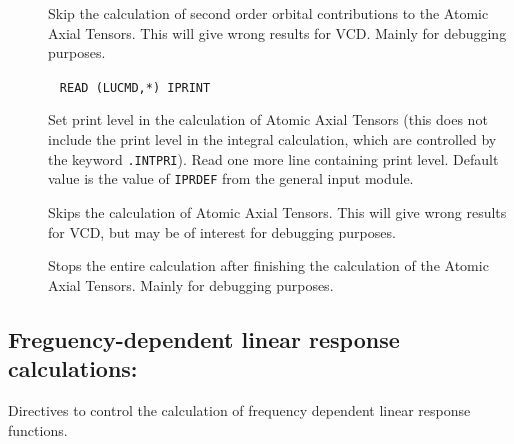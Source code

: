 \begin{description}
\item[] Skip the calculation of second order orbital
contributions to the Atomic Axial Tensors. This will give wrong
results for VCD. Mainly for debugging purposes.

\item[]\verb| |\newline
\verb|READ (LUCMD,*) IPRINT|

Set print level in the calculation of Atomic Axial Tensors (this does
not include the print level in the integral calculation, which are
controlled by the keyword \verb|.INTPRI|). Read one
more line containing print level. Default value is the value of
\verb|IPRDEF| from the general input module.

\item[] Skips the calculation of Atomic Axial Tensors.
This will give wrong results for VCD, but may be of interest for
debugging purposes.

\item[] Stops the entire calculation after finishing the
calculation of the Atomic Axial Tensors. Mainly for debugging purposes.
\end{description}

\subsection{Freguency-dependent linear response calculations: }\label{sec:abalnr}

Directives to control the calculation of frequency dependent linear
response
functions.


